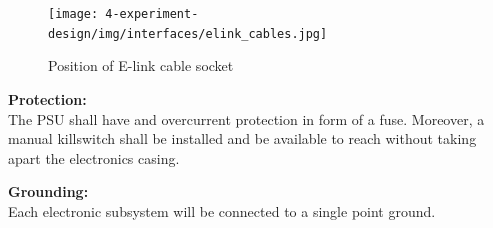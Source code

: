 \begin{figure}[H]
    \centering
	\texttt{[image: 4-experiment-design/img/interfaces/elink\_cables.jpg]}
	\caption{Position of E-link cable socket}
\end{figure}


\textbf{Protection:}\\
The PSU shall have and overcurrent protection in form of a fuse. Moreover, a manual killswitch shall be installed and be available to reach without taking apart the electronics casing.

\textbf{Grounding:}\\
Each electronic subsystem will be connected to a single point ground.





\raggedbottom